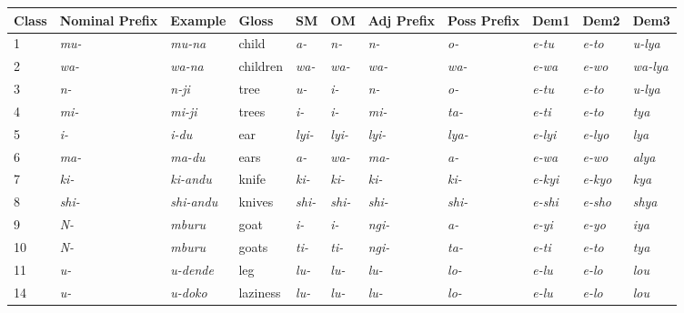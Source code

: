 \documentclass[output=paper]{langscibook}
\begin{document}
\begin{sidewaystable}
\begin{tabular}{lllllllllll}
\lsptoprule
{Class} & {Nominal} {Prefix} & {Example} & {Gloss} & {SM} & {OM} & {Adj} {Prefix} & {Poss} {Prefix} & {Dem1} & {Dem2} & {Dem3}\\
\midrule
1 & {\itshape mu-} & {\itshape mu-na} & child & \textit{a-} & \textit{n-} & \textit{n-} & \textit{o-} & {\itshape e-tu} & {\itshape e-to} & {\itshape u-lya}\\
2 & {\itshape wa-} & \textit{wa-na} & children & \textit{wa-} & \textit{wa-} & \textit{wa-} & {\itshape wa-} & {\itshape e-wa} & {\itshape e-wo} & {\itshape wa-lya}\\
3 & {\itshape n-} & {\itshape n-ji} & tree & \textit{u-} & \textit{i-} & \textit{n-} & \textit{o-} & {\itshape e-tu} & {\itshape e-to} & {\itshape u-lya}\\
4 & {\itshape mi-} & {\itshape mi-ji} & trees & \textit{i-} & \textit{i-} & \textit{mi-} & {\itshape ta-} & {\itshape e-ti} & {\itshape e-to} & {\itshape tya}\\
5 & {\itshape i-} & {\itshape i-du} & ear & \textit{lyi-} & \textit{lyi-} & \textit{lyi-} & {\itshape lya-} & {\itshape e-lyi} & {\itshape e-lyo} & {\itshape lya}\\
6 & {\itshape ma-} & {\itshape ma-du} & ears & \textit{a-} & \textit{wa-} & \textit{ma-} & {\itshape a-} & {\itshape e-wa} & {\itshape e-wo} & {\itshape alya}\\
7 & {\itshape ki-} & {\itshape ki-andu} & knife & \textit{ki-} & \textit{ki-} & \textit{ki-} & {\itshape ki-} & {\itshape e-kyi} & {\itshape e-kyo} & {\itshape kya}\\
8 & {\itshape shi-} & \textit{shi-andu} & knives & \textit{shi-} & \textit{shi-} & \textit{shi-} & {\itshape shi-} & {\itshape e-shi} & {\itshape e-sho} & {\itshape shya}\\
9 & \textit{N-} & {\itshape mburu} & goat & \textit{i-} & \textit{i-} & \textit{ngi-} & {\itshape a-} & {\itshape e-yi} & {\itshape e-yo} & {\itshape iya}\\
10 & \textit{N-} & {\itshape mburu} & goats & \textit{ti-} & \textit{ti-} & \textit{ngi-} & {\itshape ta-} & {\itshape e-ti} & {\itshape e-to} & {\itshape tya}\\
11 & {\itshape u-} & {\itshape u-dende} & leg & \textit{lu-} & \textit{lu-} & \textit{lu-} & {\itshape lo-} & {\itshape e-lu} & {\itshape e-lo} & {\itshape lou}\\
14 & {\itshape u-} & {\itshape u-doko} & laziness & \textit{lu-} & \textit{lu-} & \textit{lu-} & {\itshape lo-} & {\itshape e-lu} & {\itshape e-lo} & {\itshape lou}\\

\end{tabular}
\end{sidewaystable}
\end{document}

